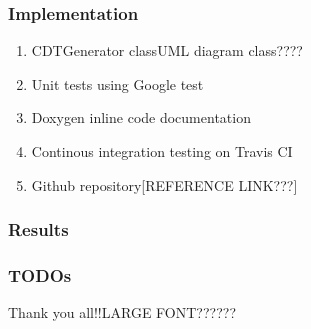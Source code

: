 \documentclass{beamer}
\begin{document}
	\begin{frame}
		\frametitle{Implementation}
			\begin{enumerate}
				\item CDTGenerator class{UML diagram class????}
				\item Unit tests using Google test
				\item Doxygen inline code documentation
				\item Continous integration testing on Travis CI	
				\item Github repository[REFERENCE LINK???]	
			\end{enumerate}
	\end{frame}	
	\begin{frame}
		\frametitle{Results} 	
	\end{frame}	
	\begin{frame}
		\frametitle{TODOs}	
	\end{frame}	
	\begin{frame}
		Thank you all!!{LARGE FONT??????}
	\end{frame}	
\end{document}

